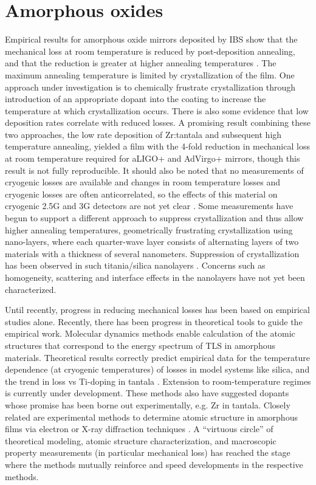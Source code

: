 \section{Amorphous oxides}
Empirical results for amorphous oxide mirrors deposited by IBS show that the mechanical loss at room temperature is reduced by post-deposition annealing, and that the reduction is greater at higher annealing temperatures \cite{vajente2018effect}. The maximum annealing temperature is limited by crystallization of the film. One approach under investigation is to chemically frustrate crystallization through introduction of an appropriate dopant into the coating to increase the temperature at which crystallization occurs. There is also some evidence that low deposition rates correlate with reduced losses. A promising result combining these two approaches, the low rate deposition of Zr:tantala and subsequent high temperature annealing, yielded a film with the 4-fold reduction in mechanical loss at room temperature required for aLIGO+ and AdVirgo+ mirrors, though this result is not fully reproducible. It should also be noted that no measurements of cryogenic losses are available and changes in room temperature losses and cryogenic losses are often anticorrelated, so the effects of this material on cryogenic 2.5G and 3G detectors are not yet clear \cite{martin2010effect}. Some measurements have begun to support a different approach to suppress crystallization and thus allow higher annealing temperatures, geometrically frustrating crystallization using nano-layers, where each quarter-wave layer consists of alternating layers of two materials with a thickness of several nanometers. Suppression of crystallization has been observed in such titania/silica nanolayers \cite{pan2014thickness}. Concerns such as homogeneity, scattering and interface effects in the nanolayers have not yet been characterized. 

Until recently, progress in reducing mechanical losses has been based on empirical studies alone. Recently, there has been progress in theoretical tools to guide the empirical work. Molecular dynamics methods enable calculation of the atomic structures that correspond to the energy spectrum of TLS in amorphous materials. Theoretical results correctly predict empirical data for the temperature dependence (at cryogenic temperatures) of losses in model systems like silica, and the trend in loss vs Ti-doping in tantala \cite{trinastic2016molecular}. Extension to room-temperature regimes is currently under development. These methods also have suggested dopants whose promise has been borne out experimentally, e.g. Zr in tantala. Closely related are experimental methods to determine atomic structure in amorphous films via electron or X-ray diffraction techniques \cite{bassiri2013correlations,hart2016medium,shyam2016measurement}. A “virtuous circle” of theoretical modeling, atomic structure characterization, and macroscopic property measurements (in particular mechanical loss) has reached the stage where the methods mutually reinforce and speed developments in the respective methods.

